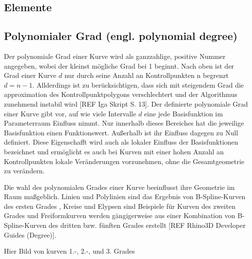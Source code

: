 \documentclass[german,a4paper,12pt,oneside]{scrbook}
\theoremstyle{definition}
\theoremstyle{definition}
\theoremstyle{definition}
\theoremstyle{definition}
\theoremstyle{definition}
\theoremstyle{definition}
\begin{document}
\subsection{Elemente}


\subsection{Polynomialer Grad (engl. polynomial degree)}
Der polynomiale Grad einer Kurve wird als ganzzahlige, positive Nummer angegeben, wobei der kleinst mögliche Grad bei 1 beginnt. Nach oben ist der Grad einer Kurve $d$ nur durch seine Anzahl an Kontrollpunkten n begrenzt $d = n - 1$. Allderdings ist zu berücksichtigen, dass sich mit steigendem Grad die approximation des Kontrollpunktpolygons verschlechtert und der Algorithmus zunehmend instabil wird [REF Iga Skript S. 13]. Der definierte polynomiale Grad einer Kurve gibt vor, auf wie viele Intervalle $d$ eine jede Basisfunktion im Parameterraum Einfluss nimmt. Nur innerhalb dieses Bereiches hat die jeweilige Basisfunktion einen Funktionswert. Außerhalb ist ihr Einfluss dagegen zu Null definiert. Diese Eigenschafft wird auch als lokaler Einfluss der Basisfunktionen bezeichnet und ermöglicht es auch bei Kurven mit einer hohen Anzahl an Kontrollpunkten lokale Veränderungen vorzunehmen, ohne die Gesamtgeometrie zu verändern.

Die wahl des polynomialen Grades einer Kurve beeinflusst ihre Geometrie im Raum maßgeblich. Linien und Polylinien sind das Ergebnis von B-Spline-Kurven des ersten Grades , Kreise und Elypsen sind Beispiele für Kurven des zweiten Grades und Freiformkurven werden gängigerweise aus einer Kombination von B-Spline-Kurven des dritten bzw. fünften Grades erstellt [REF Rhino3D Developer Guides (Degree)].

\large
\vspace{1.5cm}
\hfil
Hier Bild von kurven 1.-, 2.-, und 3. Grades

\normalsize
\end{document}
